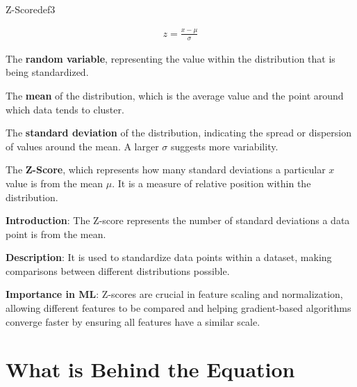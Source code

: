\documentclass[
  12 pt,
  a4paper,
]{book}
\numberwithin{equation}{section}
\theoremstyle{plain}      %
\theoremstyle{definition} %
\theoremstyle{remark}     %
\theoremstyle{note}         %
\begin{document}
\newpage

\vspace*{\fill}

\begin{a_def_eq}{Z-Score}{def3} 

\begin{align}
z = \frac{x - \mu}{\sigma}
\end{align}

\begin{description}[align=left, labelwidth=2cm, labelsep=0em, leftmargin=2cm]
    \item[$x$] The \textbf{random variable}, representing the value within the distribution that is being standardized.
    \vspace{0.5\baselineskip}
    \item[$\mu$] The \textbf{mean} of the distribution, which is the average value and the point around which data tends to cluster.
    \vspace{0.5\baselineskip}
    \item[$\sigma$] The \textbf{standard deviation} of the distribution, indicating the spread or dispersion of values around the mean. A larger $\sigma$ suggests more variability.
    \vspace{0.5\baselineskip}
    \item[$z$] The \textbf{Z-Score}, which represents how many standard deviations a particular $x$ value is from the mean $\mu$. It is a measure of relative position within the distribution.
\end{description}

\end{a_def_eq}

\hfill\break

\textbf{Introduction}: The Z-score represents the number of standard
deviations a data point is from the mean.

\textbf{Description}: It is used to standardize data points within a
dataset, making comparisons between different distributions possible.

\textbf{Importance in ML}: Z-scores are crucial in feature scaling and
normalization, allowing different features to be compared and helping
gradient-based algorithms converge faster by ensuring all features have
a similar scale.

\vspace*{\fill}

\newpage

\hypertarget{what-is-behind-the-equation-2}{%
\section*{What is Behind the
Equation}\label{what-is-behind-the-equation-2}}
\end{document}
